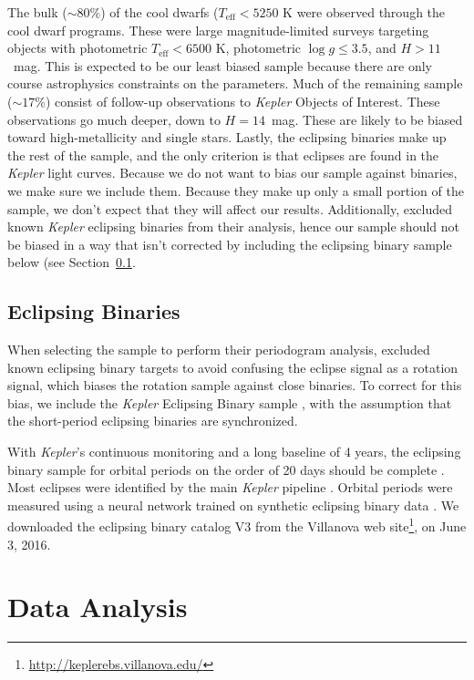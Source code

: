 \documentclass[twocolumn]{aastex6}
\newcommand{\Kepler}{\mbox{\textit{Kepler}}}
\newcommand{\Teff}{\ensuremath{T_{\textrm{eff}}}}
\newcommand{\logg}{\ensuremath{\log g}}
\begin{document}
The bulk (\(\sim80\%\)) of the cool dwarfs (\(\Teff < 5250\) K were observed through the cool dwarf
programs. These were large magnitude-limited surveys targeting objects with
photometric \(\Teff < 6500\) K, photometric \(\logg \le 3.5\), and 
\(H > 11\)~mag. This is expected to be our least biased sample because there are 
only course astrophysics constraints on the parameters. Much of the remaining 
sample (\(\sim 17\%\)) consist of follow-up observations to \Kepler{} Objects of 
Interest. These observations go much deeper, down to \(H = 14\)~mag. These are
likely to be biased toward high-metallicity and single stars. Lastly, the
eclipsing binaries make up the rest of the sample, and the only criterion is
that eclipses are found in the \Kepler{} light curves. Because we do not want
to bias our sample against binaries, we make sure we include them.
Because they make up only a small portion of the sample, we don't expect that 
they will affect our results.  Additionally, \citet{McQuillan14} excluded known
\Kepler{} eclipsing binaries from their analysis, hence our sample should not
be biased in a way that isn't corrected by including the eclipsing binary
sample below (see Section~\ref{sec:ebcat}.

\subsection{Eclipsing Binaries}
\label{sec:ebcat}

When selecting the sample to perform their periodogram analysis,
\citet{McQuillan14} excluded known eclipsing binary targets to avoid confusing
the eclipse signal as a rotation signal, which biases the rotation sample
against close binaries. To correct for this bias, we include the 
 \Kepler{} Eclipsing Binary sample \citep{Prsa11,Kirk16}, with the assumption
 that the short-period eclipsing binaries are synchronized.

With \Kepler{}'s continuous monitoring and a long baseline of 4 years, the 
eclipsing binary sample for orbital periods on the order of 20 days should be 
complete \citep{Kirk16}. Most eclipses were identified by the main
\Kepler{} pipeline \citep{Jenkins10}. Orbital periods were measured using a
neural network trained on synthetic eclipsing binary data \citep{Prsa08}. 
We downloaded the eclipsing binary catalog V3 from the Villanova web 
site\footnote{\url{http://keplerebs.villanova.edu/}}, on June 3, 2016. 

\section{Data Analysis}
\label{sec:analysis}
\end{document}
